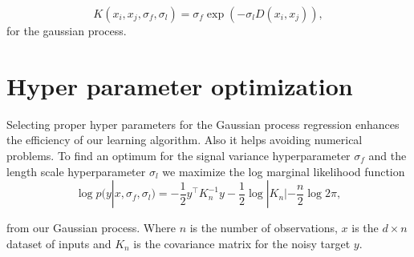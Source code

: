 \begin{equation} \label{eq:trajKernel}
K(x_{ i },x_{ j },\sigma_f,\sigma_l) = \sigma_f \exp(-\sigma_l D(x_{ i }, x_{ j })),
\end{equation}
for the gaussian process.


\section{Hyper parameter optimization}
Selecting proper hyper parameters for the Gaussian process regression enhances the efficiency of our learning algorithm. Also it helps avoiding numerical problems. To find an optimum for the signal variance hyperparameter $\sigma_f$ and the length scale hyperparameter $\sigma_l$ we maximize the log marginal likelihood function
\begin{equation} \label{eq:hypOpt}
    \log p(y|x,\sigma_f,\sigma_l) = -\frac{1}{2} y^\top K_n^{-1} y -\frac{1}{2} \log |K_n| -\frac{n}{2}\log 2\pi ,
\end{equation}

from our Gaussian process. Where $n$ is the number of observations, $x$ is the $d \times n$ dataset of inputs and $K_n$ is the covariance matrix for the noisy target $y$.
